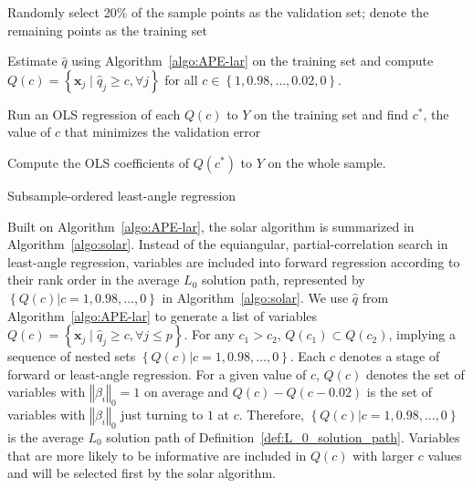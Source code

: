 \documentclass[11pt,authoryear]{elsarticle}
\begin{document}


\begin{algorithm}[h]


  \smallskip
  Randomly select 20\% of the sample points as the validation set; denote the remaining points as the training set\;

  Estimate $\widehat{q}$ using Algorithm~\ref{algo:APE-lar} on the training set and compute $Q(c) = \left\{ \mathbf{x}_j \; \vert \; \widehat{q}_j \geqslant c, \forall j\right\}$ for all $c \in \left\{ 1, 0.98, \ldots, 0.02, 0 \right\}.$

  Run an OLS regression of each $Q(c)$ to $Y$ on the training set and find $c^*$, the value of $c$ that minimizes the validation error\;

  Compute the OLS coefficients of $Q(c^*)$ to $Y$ on the whole sample.

  \caption{Subsample-ordered least-angle regression \label{algo:solar}}
\end{algorithm}

Built on Algorithm~\ref{algo:APE-lar}, the solar algorithm is summarized in Algorithm~\ref{algo:solar}. Instead of the equiangular, partial-correlation search in least-angle regression, variables are included into forward regression according to their rank order in the average $L_0$ solution path, represented by $\left\{ Q(c) \vert c = 1, 0.98, \ldots, 0\right\}$ in Algorithm~\ref{algo:solar}. We use $\widehat{q}$ from Algorithm~\ref{algo:APE-lar} to generate a list of variables $Q \left( c \right) = \left\{ \mathbf{x}_j \; \vert \; \widehat{q}_j \geqslant c, \forall j \leqslant p \right\}$. For any $c_1 > c_2$, $Q\left(c_1\right) \subset Q\left(c_2\right)$, implying a sequence of nested sets $\left\{ Q(c) \vert c = 1, 0.98, \ldots, 0\right\}$. Each $c$ denotes a stage of forward or least-angle regression. For a given value of $c$, $Q(c)$ denotes the set of variables with $\left\Vert \beta_i \right\Vert_0=1$ on average and $Q(c) - Q(c - 0.02)$ is the set of variables with $\left\Vert \beta_i \right\Vert_0$ just turning to $1$ at $c$. Therefore, $\left\{ Q(c) \vert c = 1, 0.98, \ldots, 0\right\}$ is the average $L_0$ solution path of Definition~\ref{def:L_0_solution_path}. Variables that are more likely to be informative are included in $Q(c)$ with larger $c$ values and will be selected first by the solar algorithm.
\end{document}
